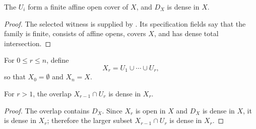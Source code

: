 \begin{lemma}
  \label{lemma:nagata-dense-affine-cover}
  \leanok

  The $U_i$ form a finite affine open cover of $X$, and $D_X$ is dense in
  $X$.
\end{lemma}

\begin{proof}
  \leanok
  The selected witness is supplied by
  .  Its specification fields say
  that the family is finite, consists of affine opens, covers $X$, and has
  dense total intersection.
\end{proof}

\begin{definition}
  \label{def:nagata-partial-affine-unions}
  \leanok

  For $0\leq r\leq n$, define
  \[
    X_r=U_1\cup\cdots\cup U_r,
  \]
  so that $X_0=\emptyset$ and $X_n=X$.
\end{definition}

\begin{lemma}
  \label{lemma:nagata-partial-union-overlap-dense}
  \leanok

  For $r>1$, the overlap $X_{r-1}\cap U_r$ is dense in $X_r$.
\end{lemma}

\begin{proof}
  \leanok
  The overlap contains $D_X$.  Since $X_r$ is open in $X$ and $D_X$ is dense
  in $X$, it is dense in $X_r$; therefore the larger subset
  $X_{r-1}\cap U_r$ is dense in $X_r$.
\end{proof}

